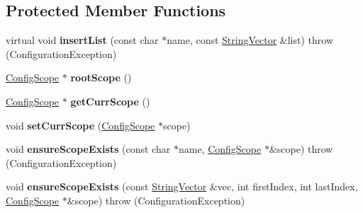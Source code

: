 \subsection*{Protected Member Functions}
\begin{DoxyCompactItemize}
\item 
\hypertarget{classCONFIG4CPP__NAMESPACE_1_1ConfigurationImpl_a8803291f5299b107f6234bc4b9e9449c}{virtual void {\bfseries insert\-List} (const char $\ast$name, const \hyperlink{classCONFIG4CPP__NAMESPACE_1_1StringVector}{String\-Vector} \&list)  throw (\-Configuration\-Exception)}\label{classCONFIG4CPP__NAMESPACE_1_1ConfigurationImpl_a8803291f5299b107f6234bc4b9e9449c}

\item 
\hypertarget{classCONFIG4CPP__NAMESPACE_1_1ConfigurationImpl_a429001fc419322d4a5746e2fbfdb0709}{\hyperlink{classCONFIG4CPP__NAMESPACE_1_1ConfigScope}{Config\-Scope} $\ast$ {\bfseries root\-Scope} ()}\label{classCONFIG4CPP__NAMESPACE_1_1ConfigurationImpl_a429001fc419322d4a5746e2fbfdb0709}

\item 
\hypertarget{classCONFIG4CPP__NAMESPACE_1_1ConfigurationImpl_a5eba5b4bad835fdd35a4ff030cc8deaf}{\hyperlink{classCONFIG4CPP__NAMESPACE_1_1ConfigScope}{Config\-Scope} $\ast$ {\bfseries get\-Curr\-Scope} ()}\label{classCONFIG4CPP__NAMESPACE_1_1ConfigurationImpl_a5eba5b4bad835fdd35a4ff030cc8deaf}

\item 
\hypertarget{classCONFIG4CPP__NAMESPACE_1_1ConfigurationImpl_a07f5facb17325645663562a964eac628}{void {\bfseries set\-Curr\-Scope} (\hyperlink{classCONFIG4CPP__NAMESPACE_1_1ConfigScope}{Config\-Scope} $\ast$scope)}\label{classCONFIG4CPP__NAMESPACE_1_1ConfigurationImpl_a07f5facb17325645663562a964eac628}

\item 
\hypertarget{classCONFIG4CPP__NAMESPACE_1_1ConfigurationImpl_af3ef4bf1e5c90a3a88fe2ec4c5f69bfd}{void {\bfseries ensure\-Scope\-Exists} (const char $\ast$name, \hyperlink{classCONFIG4CPP__NAMESPACE_1_1ConfigScope}{Config\-Scope} $\ast$\&scope)  throw (\-Configuration\-Exception)}\label{classCONFIG4CPP__NAMESPACE_1_1ConfigurationImpl_af3ef4bf1e5c90a3a88fe2ec4c5f69bfd}

\item 
\hypertarget{classCONFIG4CPP__NAMESPACE_1_1ConfigurationImpl_a4370deb6673ed9683eade3b4a9938248}{void {\bfseries ensure\-Scope\-Exists} (const \hyperlink{classCONFIG4CPP__NAMESPACE_1_1StringVector}{String\-Vector} \&vec, int first\-Index, int last\-Index, \hyperlink{classCONFIG4CPP__NAMESPACE_1_1ConfigScope}{Config\-Scope} $\ast$\&scope)  throw (\-Configuration\-Exception)}\label{classCONFIG4CPP__NAMESPACE_1_1ConfigurationImpl_a4370deb6673ed9683eade3b4a9938248}


\end{DoxyCompactItemize}
